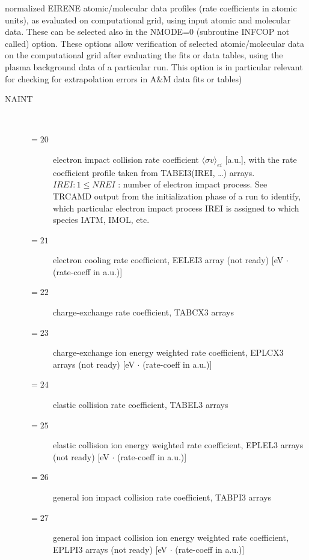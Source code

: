 normalized EIRENE atomic/molecular data profiles (rate coefficients in atomic
units), as evaluated on computational grid,
using input atomic and molecular data.
These can be selected also in the NMODE=0 (subroutine INFCOP not called)
option.
These options allow verification of selected atomic/molecular data on the
computational grid after evaluating the fits or data tables, using the plasma
background data of a particular run.
This option is in particular relevant for checking for extrapolation errors in
A$\&$M data fits or tables)
\begin{description}
  \item[NAINT] ~

        \begin{description}
          \item[$= 20$] electron impact collision rate coefficient
                $\langle\sigma v\rangle_{ei}$ [a.u.], with the rate coefficient profile taken 
                from TABEI3(IREI, \dots) arrays.
                $IREI: 1 \le NREI$ : number of electron impact process.
                See TRCAMD output from the initialization phase of a run to identify, which
                particular electron impact process IREI is assigned to which species IATM,
                IMOL, etc.
          \item[$= 21$] electron cooling rate coefficient, EELEI3 array (not
                ready) [\si{\electronvolt} $\cdot$ (rate-coeff in a.u.)]
          \item[$= 22$]
                charge-exchange rate coefficient, TABCX3 arrays
          \item[$= 23$]
                charge-exchange ion energy weighted rate coefficient, EPLCX3
                arrays (not ready)
                [\si{\electronvolt} $\cdot$ (rate-coeff in a.u.)]
          \item[$= 24$]
                elastic collision rate coefficient, TABEL3 arrays
          \item[$= 25$]
                elastic collision ion energy weighted rate coefficient, EPLEL3
                arrays (not ready)
                [\si{\electronvolt} $\cdot$ (rate-coeff in a.u.)]
          \item[$= 26$]
                general ion impact collision rate coefficient, TABPI3 arrays
          \item[$= 27$]
                general ion impact collision ion energy weighted rate
                coefficient, EPLPI3 arrays (not ready)
                [\si{\electronvolt} $\cdot$ (rate-coeff in a.u.)]

\end{description}
\end{description}
